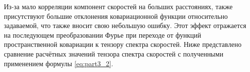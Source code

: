 Из-за мало корреляции компонент скоростей на больших расстояниях, также присутствуют большие отклонения ковариационной функции относительно задаваемой, что также вносит свою небольшую ошибку. Этот эффект отражается на последующем преобразовании Фурье при переходе от функций пространственной ковариации к тензору спектра скоростей. Ниже представлено сравнение расчётных значений тензора спектра скоростей с полученными применением формулы \eqref{eq:part3_2}. 
\noindent
\begin{figure}[!h]
\end{figure}
